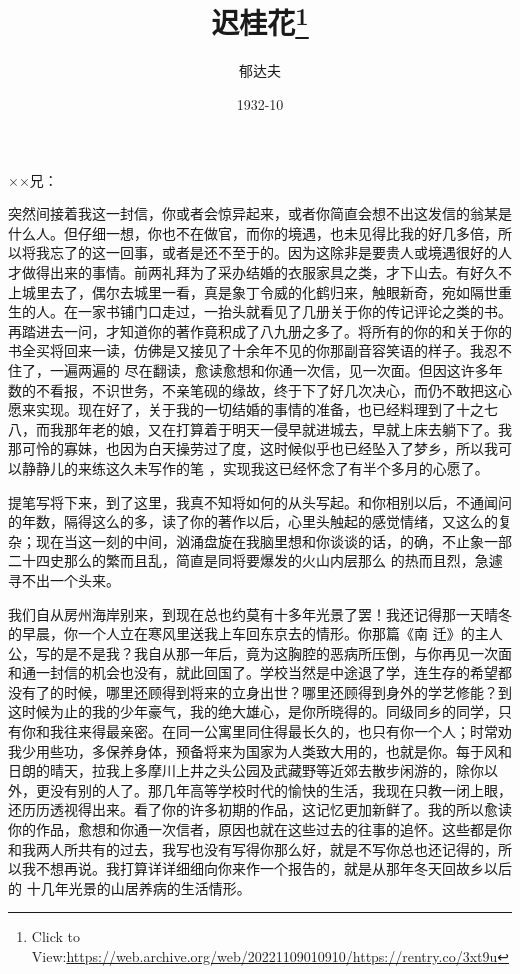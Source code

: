 \documentclass{article}
\title{迟桂花\footnote{Click to View:\url{https://web.archive.org/web/20221109010910/https://rentry.co/3xt9u}}}
\author{郁达夫}
\date{1932-10}
\begin{document}

\maketitle


\Large


﻿××兄： 

突然间接着我这一封信，你或者会惊异起来，或者你简直会想不出这发信的翁某是什么人。但仔细一想，你也不在做官，而你的境遇，也未见得比我的好几多倍，所以将我忘了的这一回事，或者是还不至于的。因为这除非是要贵人或境遇很好的人才做得出来的事情。前两礼拜为了采办结婚的衣服家具之类，才下山去。有好久不上城里去了，偶尔去城里一看，真是象丁令威的化鹤归来，触眼新奇，宛如隔世重生的人。在一家书铺门口走过，一抬头就看见了几册关于你的传记评论之类的书。再踏进去一问，才知道你的著作竟积成了八九册之多了。将所有的你的和关于你的书全买将回来一读，仿佛是又接见了十余年不见的你那副音容笑语的样子。我忍不住了，一遍两遍的
\newpage
尽在翻读，愈读愈想和你通一次信，见一次面。但因这许多年数的不看报，不识世务，不亲笔砚的缘故，终于下了好几次决心，而仍不敢把这心愿来实现。现在好了，关于我的一切结婚的事情的准备，也已经料理到了十之七八，而我那年老的娘，又在打算着于明天一侵早就进城去，早就上床去躺下了。我那可怜的寡妹，也因为白天操劳过了度，这时候似乎也已经坠入了梦乡，所以我可以静静儿的来练这久未写作的笔
，实现我这已经怀念了有半个多月的心愿了。 

提笔写将下来，到了这里，我真不知将如何的从头写起。和你相别以后，不通闻问的年数，隔得这么的多，读了你的著作以后，心里头触起的感觉情绪，又这么的复杂；现在当这一刻的中间，汹涌盘旋在我脑里想和你谈谈的话，的确，不止象一部二十四史那么的繁而且乱，简直是同将要爆发的火山内层那么
的热而且烈，急遽寻不出一个头来。 

我们自从房州海岸别来，到现在总也约莫有十多年光景了罢！我还记得那一天晴冬的早晨，你一个人立在寒风里送我上车回东京去的情形。你那篇《南
\newpage
迁》的主人公，写的是不是我？我自从那一年后，竟为这胸腔的恶病所压倒，与你再见一次面和通一封信的机会也没有，就此回国了。学校当然是中途退了学，连生存的希望都没有了的时候，哪里还顾得到将来的立身出世？哪里还顾得到身外的学艺修能？到这时候为止的我的少年豪气，我的绝大雄心，是你所晓得的。同级同乡的同学，只有你和我往来得最亲密。在同一公寓里同住得最长久的，也只有你一个人；时常劝我少用些功，多保养身体，预备将来为国家为人类致大用的，也就是你。每于风和日朗的晴天，拉我上多摩川上井之头公园及武藏野等近郊去散步闲游的，除你以外，更没有别的人了。那几年高等学校时代的愉快的生活，我现在只教一闭上眼，还历历透视得出来。看了你的许多初期的作品，这记忆更加新鲜了。我的所以愈读你的作品，愈想和你通一次信者，原因也就在这些过去的往事的追怀。这些都是你和我两人所共有的过去，我写也没有写得你那么好，就是不写你总也还记得的，所以我不想再说。我打算详详细细向你来作一个报告的，就是从那年冬天回故乡以后的
十几年光景的山居养病的生活情形。 
\end{document}
